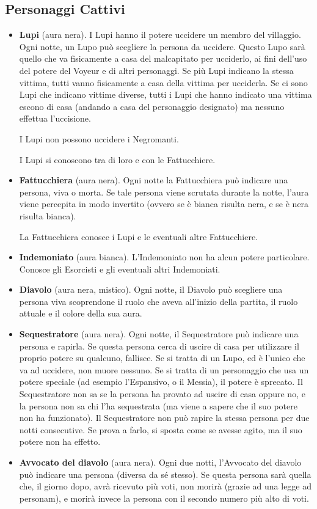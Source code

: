 \documentclass[a4paper,10pt]{article}
\begin{document}
\subsection*{Personaggi Cattivi}

\begin{itemize}
 \item {\bf Lupi} (aura nera). I Lupi hanno il potere uccidere un membro del villaggio.
 Ogni notte, un Lupo può scegliere la persona da uccidere. Questo Lupo sarà quello che va fisicamente a casa del malcapitato per ucciderlo, ai fini dell'uso del potere del Voyeur e di altri personaggi. Se più Lupi indicano la stessa vittima, tutti vanno fisicamente a casa della vittima per ucciderla.
 Se ci sono Lupi che indicano vittime diverse, tutti i Lupi che hanno indicato una vittima escono di casa (andando a casa del personaggio designato) ma nessuno effettua l'uccisione.
 
 I Lupi non possono uccidere i Negromanti.
 
 I Lupi si conoscono tra di loro e con le Fattucchiere.

 \item {\bf Fattucchiera} (aura nera). Ogni notte la Fattucchiera può indicare una persona, viva o morta. Se tale persona viene scrutata durante la notte, l'aura viene percepita in modo invertito (ovvero se è bianca risulta nera, e se è nera risulta bianca).
 
 La Fattucchiera conosce i Lupi e le eventuali altre Fattucchiere.
 
 \item {\bf Indemoniato} (aura bianca). L'Indemoniato non ha alcun potere particolare. Conosce gli Esorcisti e gli eventuali altri Indemoniati.

 \item {\bf Diavolo} (aura nera, mistico). Ogni notte, il Diavolo può scegliere una persona viva scoprendone il ruolo che aveva all'inizio della partita, il ruolo attuale e il colore della sua aura.
 
 \item {\bf Sequestratore} (aura nera). Ogni notte, il Sequestratore può indicare una persona e rapirla. Se questa persona cerca di uscire di casa per utilizzare il proprio potere su qualcuno, fallisce. Se si tratta di un Lupo, ed è l'unico che va ad uccidere, non muore nessuno. Se si tratta di un personaggio che usa un potere speciale (ad esempio l'Espansivo, o il Messia), il potere è sprecato.
 Il Sequestratore non sa se la persona ha provato ad uscire di casa oppure no, e la persona non sa chi l'ha sequestrata (ma viene a sapere che il suo potere non ha funzionato).
 Il Sequestratore non può rapire la stessa persona per due notti consecutive. Se prova a farlo, si sposta come se avesse agito, ma il suo potere non ha effetto.

 \item {\bf Avvocato del diavolo} (aura nera). Ogni due notti, l'Avvocato del diavolo può indicare una persona (diversa da sé stesso). Se questa persona sarà quella che, il giorno dopo, avrà ricevuto più voti, non morirà (grazie ad una legge ad personam), e morirà invece la persona con il secondo numero più alto di voti.


\end{itemize}
\end{document}
